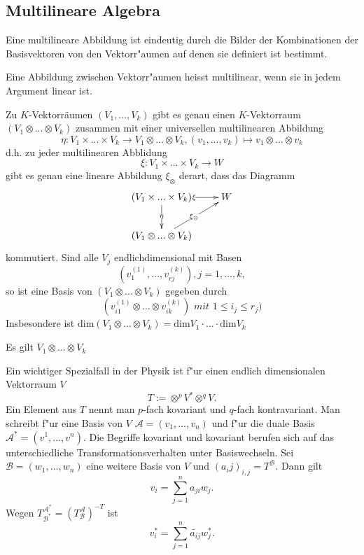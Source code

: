 \documentclass[11pt, a4paper]{article}
\begin{document}
\subsection{Multilineare Algebra}
\begin{remark}
Eine multilineare Abbildung ist eindeutig durch die Bilder der Kombinationen der Basisvektoren von den Vektorr"aumen auf denen sie definiert ist bestimmt.
\end{remark}

\begin{definition}
Eine Abbildung zwischen Vektorr"aumen heisst multilinear, wenn sie in jedem Argument linear ist. 
\end{definition}

\begin{theorem}
Zu $K$-Vektorräumen $(V_1,...,V_k)$ gibt es genau einen $K$-Vektorraum $(V_1  \otimes ...  \otimes V_k)$ zusammen mit einer universellen multilinearen Abbildung 
$$
\eta : V_1 \times ... \times V_k  \rightarrow V_1\otimes ... \otimes V_k ,   (v_1,...,v_k) \mapsto v_1\otimes...\otimes v_k
$$
d.h. zu jeder multilinearen Abblidung
$$
\xi: V_1 \times ... \times V_k \rightarrow W
$$
gibt es genau eine lineare Abbildung $\xi_\otimes$ derart, dass das Diagramm 
\begin{gather*}
  \xymatrix{(V_1 \times ... \times V_k)  \ar[d]|{\eta} \ar[r]|{\xi} & W\\
    (V_1 \otimes ... \otimes V_k) \ar[ur]|{\xi_\otimes} & }
\end{gather*}
kommutiert. Sind alle $V_j$ endlichdimensional mit Basen 
$$
(v_1^{(1)},...,v_{rj}^{(k)}), j = 1,...,k,
$$
so ist eine Basis von $(V_1  \otimes ...  \otimes V_k)$ gegeben durch
$$
(v_{i1}^{(1)} \otimes...\otimes v_{ik}^{(k)}) \textit{ mit }  1 \leq i_j \leq r_j)
$$ 
Insbesondere ist $\mathrm{dim}(V_1\otimes...\otimes V_k) = \mathrm{dim} V_1\cdot ... \cdot \mathrm{dim}V_k$
\end{theorem}

\begin{remark}
Es gilt $V_1 \otimes ... \otimes V_k $%
\end{remark}

\begin{remark}
Ein wichtiger Spezialfall in der Physik ist f"ur einen endlich dimensionalen Vektorraum $V$
$$
T:= \otimes^p V^* \otimes^q V.
$$
Ein Element aus $T$ nennt man $p$-fach kovariant und $q$-fach kontravariant. Man schreibt f"ur eine Basis von $V$ $\mathcal{A} = (v_1, ..., v_n)$ und f"ur die duale Basis $\mathcal{A}^* = (v^1, ..., v^n)$.
Die Begriffe kovariant und kovariant berufen sich auf das unterschiedliche Transformationsverhalten unter Basiswechseln. Sei $\mathcal{B} = (w_1, ..., w_n)$ eine weitere Basis von $V$ und $(a_ij)_{i, j} = T^\mathcal{B}$. Dann gilt
$$
v_i =\sum\limits_{j = 1}^n a_{ji}w_j.
$$
Wegen $T^{\mathcal{A}^*}_{\mathcal{B}^*} = (T^{\mathcal{A}}_{\mathcal{B}})^{-T}$ ist 
$$
v_i^* =\sum\limits_{j = 1}^n \tilde{a_{ij}}w_j^*.
$$
\end{remark}
\end{document}
